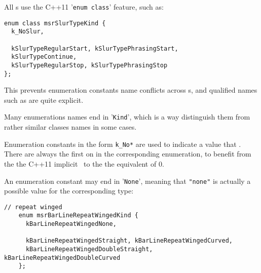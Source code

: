 All \enumType s use the C++11 '{\tt enum class}' feature, such as:

\begin{lstlisting}[language=CPlusPlus]
enum class msrSlurTypeKind {
  k_NoSlur,

  kSlurTypeRegularStart, kSlurTypePhrasingStart,
  kSlurTypeContinue,
  kSlurTypeRegularStop, kSlurTypePhrasingStop
};
\end{lstlisting}

This prevents enumeration constants name conflicts across \enumType s, and qualified names such as  are quite explicit.

Many enumerations names end in '{\tt Kind}', which is a way distinguish them from rather similar classes names in some cases.

Enumeration constants in the form {\tt k_No*} are used to indicate a value that . There are always the first on in the corresponding enumeration, to benefit from the the C++11 implicit \initialization\  to the the equivalent of 0.

An enumeration constant may end in '{\tt None}', meaning that {\tt "none"} is actually a possible value for the corresponding type:
\begin{lstlisting}[language=CPlusPlus]
    // repeat winged
    enum msrBarLineRepeatWingedKind {
      kBarLineRepeatWingedNone,

      kBarLineRepeatWingedStraight, kBarLineRepeatWingedCurved,
      kBarLineRepeatWingedDoubleStraight, kBarLineRepeatWingedDoubleCurved
    };
\end{lstlisting}

